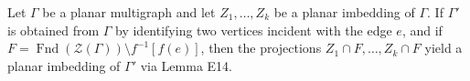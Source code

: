 Let $\Gamma$ be a planar multigraph and let $Z_1, \ldots, Z_k$ be a planar imbedding of $\Gamma$. If $\Gamma'$ is obtained from $\Gamma$ by identifying two vertices incident with the edge $e$, and if $F = \operatorname{Fnd}(\mathcal{Z}(\Gamma)) \setminus f^{-1}[f(e)]$, then the projections $Z_1 \cap F, \ldots, Z_k \cap F$ yield a planar imbedding of $\Gamma'$ via Lemma E14.
